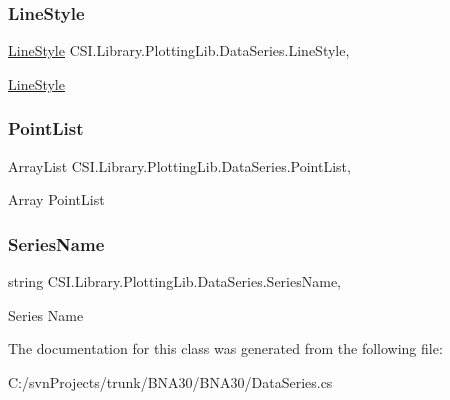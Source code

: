 \subsubsection{\texorpdfstring{LineStyle}{LineStyle}}
{\footnotesize\ttfamily \mbox{\hyperlink{class_c_s_i_1_1_library_1_1_plotting_lib_1_1_line_style}{Line\+Style}} C\+S\+I.\+Library.\+Plotting\+Lib.\+Data\+Series.\+Line\+Style\hspace{0.3cm}{\ttfamily [get]}, {\ttfamily [set]}}



\mbox{\hyperlink{class_c_s_i_1_1_library_1_1_plotting_lib_1_1_line_style}{Line\+Style}} 

\mbox{\label{class_c_s_i_1_1_library_1_1_plotting_lib_1_1_data_series_a16bc801d66c6e4d327df04933d4f304e}} 
\subsubsection{\texorpdfstring{PointList}{PointList}}
{\footnotesize\ttfamily Array\+List C\+S\+I.\+Library.\+Plotting\+Lib.\+Data\+Series.\+Point\+List\hspace{0.3cm}{\ttfamily [get]}, {\ttfamily [set]}}



Array Point\+List 

\mbox{\label{class_c_s_i_1_1_library_1_1_plotting_lib_1_1_data_series_aafa1978c0fd23c729e0a579f89b0aa78}} 
\subsubsection{\texorpdfstring{SeriesName}{SeriesName}}
{\footnotesize\ttfamily string C\+S\+I.\+Library.\+Plotting\+Lib.\+Data\+Series.\+Series\+Name\hspace{0.3cm}{\ttfamily [get]}, {\ttfamily [set]}}



Series Name 



The documentation for this class was generated from the following file\+:\begin{DoxyCompactItemize}
\item 
C\+:/svn\+Projects/trunk/\+B\+N\+A30/\+B\+N\+A30/Data\+Series.\+cs\end{DoxyCompactItemize}
